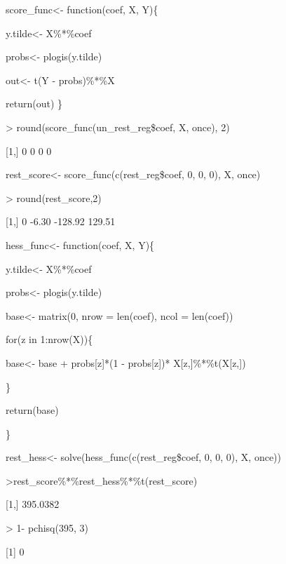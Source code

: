 \documentclass{beamer}
\begin{document}
\begin{frame}

\small
\begin{semiverbatim}

 score\_func<- function(coef, X, Y)\{

  \hspace{0.15in} y.tilde<- X\%*\%coef

  \hspace{0.15in} probs<- plogis(y.tilde)

 \hspace{0.15in}  out<- t(Y - probs)\%*\%X

 \hspace{0.15in}  return(out)
   \}



> round(score\_func(un\_rest\_reg\$coef, X, once), 2)


[1,] 0      0   0 0


rest\_score<- score\_func(c(rest\_reg\$coef, 0, 0, 0), X, once)


> round(rest\_score,2)

[1,] 0 -6.30 -128.92 129.51

\end{semiverbatim}
\end{frame}


\begin{frame}
\small
\begin{semiverbatim}

 hess\_func<- function(coef, X, Y)\{

   \hspace{0.15in}  y.tilde<- X\%*\%coef

  \hspace{0.15in}   probs<- plogis(y.tilde)

  \hspace{0.15in}   base<- matrix(0, nrow = len(coef), ncol = len(coef))

   \hspace{0.15in}  for(z in 1:nrow(X))\{

   \hspace{0.25in}    base<- base + probs[z]*(1 - probs[z])* X[z,]\%*\%t(X[z,])

     \hspace{0.15in}  \}

     \hspace{0.15in} return(base)

   \}


 rest\_hess<- solve(hess\_func(c(rest\_reg\$coef, 0, 0, 0), X, once))

>rest\_score\%*\%rest\_hess\%*\%t(rest\_score)

[1,] 395.0382

> 1- pchisq(395, 3)

[1] 0

\end{semiverbatim}

\end{frame}
\end{document}
